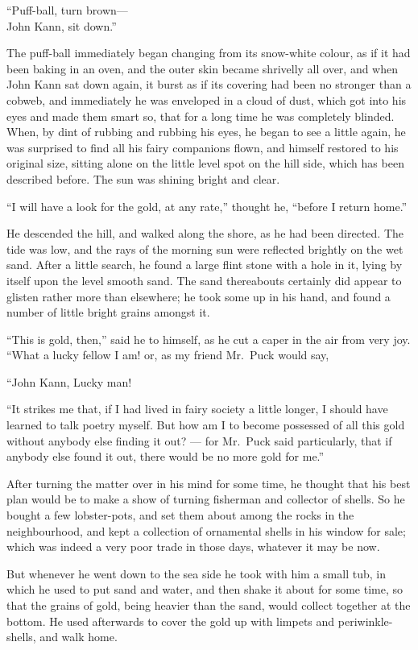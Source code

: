\documentclass[
  12pt,
  a5paper,
  twoside]{book}
\begin{document}
``Puff-ball, turn brown---\\
John Kann, sit down.''

The puff-ball immediately began changing from its snow-white colour, as
if it had been baking in an oven, and the outer skin became shrivelly
all over, and when John Kann sat down again, it burst as if its covering
had been no stronger than a cobweb, and immediately he was enveloped in
a cloud of dust, which got into his eyes and made them smart so, that
for a long time he was completely blinded. When, by dint of rubbing and
rubbing his eyes, he began to see a little again, he was surprised to
find all his fairy companions flown, and himself restored to his
original size, sitting alone on the little level spot on the hill side,
which has been described before. The sun was shining bright and clear.

``I will have a look for the gold, at any rate,'' thought he, ``before I
return home.''

He descended the hill, and walked along the shore, as he had been
directed. The tide was low, and the rays of the morning sun were
reflected brightly on the wet sand. After a little search, he found a
large flint stone with a hole in it, lying by itself upon the level
smooth sand. The sand thereabouts certainly did appear to glisten rather
more than elsewhere; he took some up in his hand, and found a number of
little bright grains amongst it.

``This is gold, then,'' said he to himself, as he cut a caper in the air
from very joy. ``What a lucky fellow I am! or, as my friend Mr.~Puck
would say,

``John Kann, Lucky man!

``It strikes me that, if I had lived in fairy society a little longer, I
should have learned to talk poetry myself. But how am I to become
possessed of all this gold without anybody else finding it out? --- for
Mr.~Puck said particularly, that if anybody else found it out, there
would be no more gold for me.''

After turning the matter over in his mind for some time, he thought that
his best plan would be to make a show of turning fisherman and collector
of shells. So he bought a few lobster-pots, and set them about among the
rocks in the neighbourhood, and kept a collection of ornamental shells
in his window for sale; which was indeed a very poor trade in those
days, whatever it may be now.

But whenever he went down to the sea side he took with him a small tub,
in which he used to put sand and water, and then shake it about for some
time, so that the grains of gold, being heavier than the sand, would
collect together at the bottom. He used afterwards to cover the gold up
with limpets and periwinkle-shells, and walk home.
\end{document}
